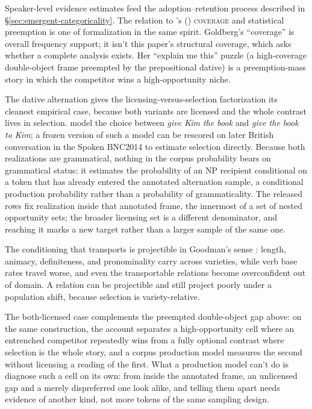 \documentclass[12pt,letterpaper]{article}
\newcommand{\term}[1]{\textsc{#1}}
\newcommand{\mention}[1]{\textit{#1}}
\newcommand{\posscite}[1]{\citeauthor{#1}'s (\citeyear{#1})}
\begin{document}
Speaker-level evidence estimates feed the adoption--retention process described
in \S\ref{sec:emergent-categoricality}. The relation to
\posscite{goldberg2019} \term{coverage} and statistical preemption is one of
formalization in the same spirit. Goldberg's \enquote{coverage} is overall
frequency support; it isn't this paper's structural coverage, which asks
whether a complete analysis exists. Her \enquote{explain me this} puzzle (a
high-coverage double-object frame preempted by the prepositional dative) is a
preemption-mass story in which the competitor wins a high-opportunity niche.

The dative alternation gives the licensing-versus-selection factorization its
cleanest empirical case, because both variants are licensed and the whole
contrast lives in selection. \textcite{bresnan2007} model the choice between
\mention{give Kim the book} and \mention{give the book to Kim}; a frozen version
of such a model can be rescored on later British conversation in the Spoken
BNC2014 to estimate selection directly. Because both realizations are
grammatical, nothing in the corpus probability bears on grammatical status: it
estimates the probability of an NP recipient conditional on a token
that has already entered the annotated alternation sample, a conditional
production probability rather than a probability of grammaticality. The released
rows fix realization inside that annotated frame, the innermost of a set of
nested opportunity sets; the broader licensing set is a different denominator,
and reaching it marks a new target rather than a larger sample of the
same one.

The conditioning that transports is projectible in Goodman's sense
\autocite{Goodman1955}: length, animacy, definiteness, and pronominality carry
across varieties, while verb base rates travel worse, and even the transportable
relations become overconfident out of domain. A relation can be projectible and
still project poorly under a population shift, because selection is
variety-relative.

The both-licensed case complements the preempted double-object gap above: on the
same construction, the account separates a high-opportunity cell where an
entrenched competitor repeatedly wins from a fully optional contrast where
selection is the whole story, and a corpus production model measures the second
without licensing a reading of the first. What a production model can't do is
diagnose such a cell on its own: from inside the annotated frame, an unlicensed
gap and a merely dispreferred one look alike, and telling them apart needs
evidence of another kind, not more tokens of the same sampling design.
\end{document}
